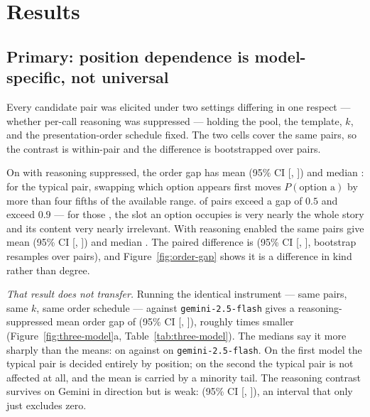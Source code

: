 \section{Results}
\label{sec:results}

\subsection{Primary: position dependence is model-specific, not universal}
\label{sec:posbias}

Every candidate pair was elicited under two settings differing in one respect ---
whether per-call reasoning was suppressed --- holding the pool, the template, $k$, and
the presentation-order schedule fixed. The two cells cover the same \pbN{} pairs, so
the contrast is within-pair and the difference is bootstrapped over pairs.

On \pairModel{} with reasoning suppressed, the order gap has mean \pbOffMean{}
(95\% CI [\pbOffLo{}, \pbOffHi{}]) and median \pbOffMed{}: for the typical pair,
swapping which option appears first moves $P(\text{option a})$ by more than four fifths
of the available range. \pbOffGtFifty{} of \pbN{} pairs exceed a gap of $0.5$ and
\pbOffGtNinety{} exceed $0.9$ --- for those \pbOffGtNinety{}, the slot an option occupies
is very nearly the whole story and its content very nearly irrelevant. With reasoning
enabled the same pairs give mean \pbOnMean{} (95\% CI [\pbOnLo{}, \pbOnHi{}]) and median
\pbOnMed{}. The paired difference is \pbDiff{} (95\% CI [\pbDiffLo{}, \pbDiffHi{}],
\pbBoot{} bootstrap resamples over pairs), and Figure~\ref{fig:order-gap} shows it is a
difference in kind rather than degree.

\emph{That result does not transfer.} Running the identical instrument --- same
\pbN{} pairs, same $k$, same order schedule --- against \texttt{gemini-2.5-flash} gives a
reasoning-suppressed mean order gap of \extGtwoOff{}
(95\% CI [\extGtwoOffLo{}, \extGtwoOffHi{}]), roughly \extRatio{} times smaller
(Figure~\ref{fig:three-model}a, Table~\ref{tab:three-model}). The medians say it more
sharply than the means: \extDsOffMed{} on \pairModel{} against \extGtwoOffMed{} on
\texttt{gemini-2.5-flash}. On the first model the typical pair is decided entirely by
position; on the second the typical pair is not affected at all, and the mean is carried
by a minority tail. The reasoning contrast survives on Gemini in direction but is weak:
\extGtwoDiff{} (95\% CI [\extGtwoDiffLo{}, \extGtwoDiffHi{}]), an interval that only just
excludes zero.

